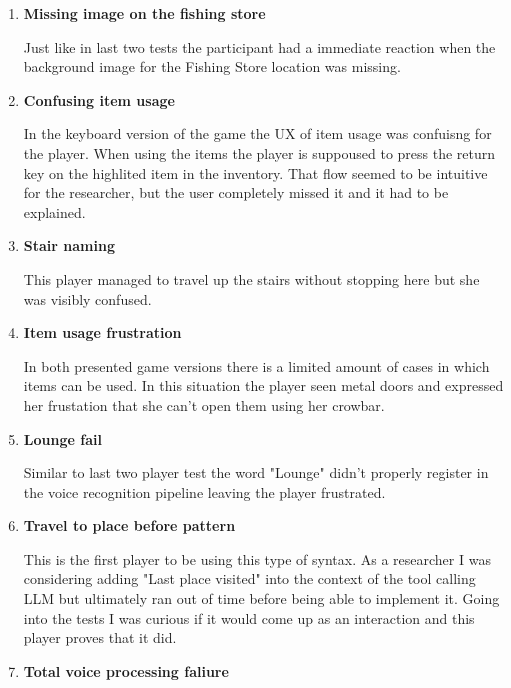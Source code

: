 \begin{enumerate}
    \item \textbf{Missing image on the fishing store}
    
    Just like in last two tests the participant had a immediate reaction when the background image for the Fishing Store location was missing.


    \item \textbf{Confusing item usage}
    
    In the keyboard version of the game the UX of item usage was confuisng for the player. When using the items the player is suppoused to press the return key on the highlited item in the inventory. That flow seemed to be intuitive for the researcher, but the user completely missed it and it had to be explained.







    \item \textbf{Stair naming}
    
    This player managed to travel up the stairs without stopping here but she was visibly confused. 


    \item \textbf{Item usage frustration}
    
    In both presented game versions there is a limited amount of cases in which items can be used. In this situation the player seen metal doors and expressed her frustation that she can't open them using her crowbar.


    \item \textbf{Lounge fail}
    
    Similar to last two player test the word "Lounge" didn't properly register in the voice recognition pipeline leaving the player frustrated.



    \item \textbf{Travel to place before pattern}
    
    This is the first player to be using this type of syntax. As a researcher I was considering adding "Last place visited" into the context of the tool calling LLM but ultimately ran out of time before being able to implement it. Going into the tests I was curious if it would come up as an interaction and this player proves that it did.


    \item \textbf{Total voice processing faliure}
    

\end{enumerate}
